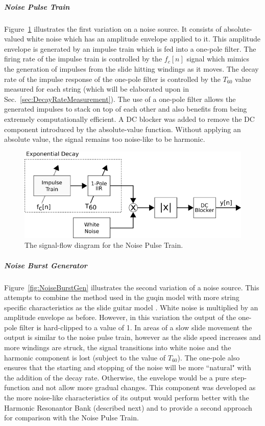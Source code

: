 \documentclass[../main.tex]{subfiles}
\begin{document}
\subparagraph{Noise Pulse Train}
\label{para:NPT}
Figure~\ref{fig:NoisePulseTrain} illustrates the first variation on a noise source. It consists of absolute-valued white noise which has an amplitude envelope applied to it. This amplitude envelope is generated by an impulse train which is fed into a one-pole filter. The firing rate of the impulse train is controlled by the $f_c[n]$ signal which mimics the generation of impulses from the slide hitting windings as it moves. The decay rate of the impulse response of the one-pole filter is controlled by the $T_{60}$ value measured for each string (which will be elaborated upon in Sec.~\ref{sec:DecayRateMeasurement}). The use of a one-pole filter allows the generated impulses to stack on top of each other and also benefits from being extremely computationally efficient. A DC blocker was added to remove the DC component introduced by the absolute-value function. Without applying an absolute value, the signal remains too noise-like to be harmonic.

\begin{figure}[h]
    \centering
    \includegraphics[scale=.5]{./images/diagrams/NoisePulseTrain.png}
    \caption{The signal-flow diagram for the Noise Pulse Train.}
    \label{fig:NoisePulseTrain}
\end{figure}

\subparagraph{Noise Burst Generator}
\label{subpara:Ch3NBG}
Figure~\ref{fig:NoiseBurstGen} illustrates the second variation of a noise source. This attempts to combine the method used in the guqin model  with more string specific characteristics as the slide guitar model . White noise is multiplied by an amplitude envelope as before. However, in this variation the output of the one-pole filter is hard-clipped to a value of 1. In areas of a slow slide movement the output is similar to the noise pulse train, however as the slide speed increases and more windings are struck, the signal transitions into white noise and the harmonic component is lost (subject to the value of $T_{60}$). The one-pole also ensures that the starting and stopping of the noise will be more ``natural" with the addition of the decay rate. Otherwise, the envelope would be a pure step-function and not allow more gradual changes. This component was developed as the more noise-like characteristics of its output would perform better with the Harmonic Resonantor Bank (described next) and to provide a second approach for comparison with the Noise Pulse Train.
\end{document}
